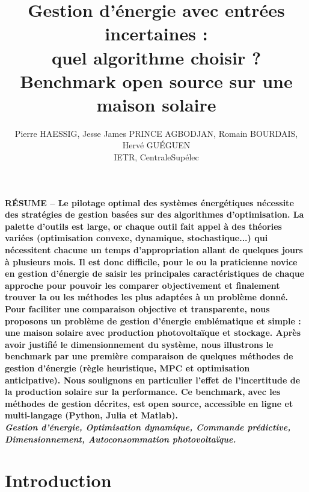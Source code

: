 \documentclass[a4paper,10pt,twocolumn]{article}
\title{
\fontsize{24pt}{24pt}\selectfont
Gestion d'énergie avec entrées incertaines : \\
quel algorithme choisir ?\\
Benchmark open source sur une maison solaire
}
\author{
\fontsize{11pt}{11pt}\selectfont
Pierre HAESSIG\tsp{*}, Jesse James PRINCE AGBODJAN\tsp{*}, Romain BOURDAIS\tsp{*}, Hervé GUÉGUEN\tsp{*}\\
\fontsize{10pt}{10pt}\selectfont
\tsp{*}IETR, CentraleSupélec
}
\date{}
\newcommand\tpc{\textperiodcentered} %
\begin{document}
\maketitle
\thispagestyle{fancy}


\fontsize{9pt}{9pt}\selectfont
\textbf{RÉSUME --
Le pilotage optimal des systèmes énergétiques nécessite des stratégies
de gestion basées sur des algorithmes d'optimisation.
La palette d'outils est large, or chaque outil fait appel à des théories variées
(optimisation convexe, dynamique, stochastique...)
qui nécessitent chacune un temps d'appropriation allant de quelques jours à plusieurs mois.
%
Il est donc difficile, pour le ou la praticien\tpc{}ne novice en gestion d'énergie
de saisir les principales caractéristiques de chaque approche
pour pouvoir les comparer objectivement et finalement trouver
la ou les méthodes les plus adaptées à un problème donné.
%
Pour faciliter une comparaison objective et transparente,
nous proposons un problème de gestion d'énergie emblématique et simple : une maison solaire
avec production photovoltaïque et stockage.
Après avoir justifié le dimensionnement du système,
nous illustrons le benchmark par une première comparaison de quelques méthodes de gestion d'énergie
(règle heuristique, MPC et optimisation anticipative).
Nous soulignons en particulier l'effet de l'incertitude de la production solaire
sur la performance.
Ce benchmark, avec les méthodes de gestion décrites,
est open source, accessible en ligne et multi-langage (Python, Julia et Matlab).
}\\

\textbf{\textit{Gestion d'énergie, Optimisation dynamique,
Commande prédictive, Dimensionnement, Autoconsommation photovoltaïque.}}

\fontsize{10pt}{10pt}\selectfont


\section{Introduction}
\end{document}
